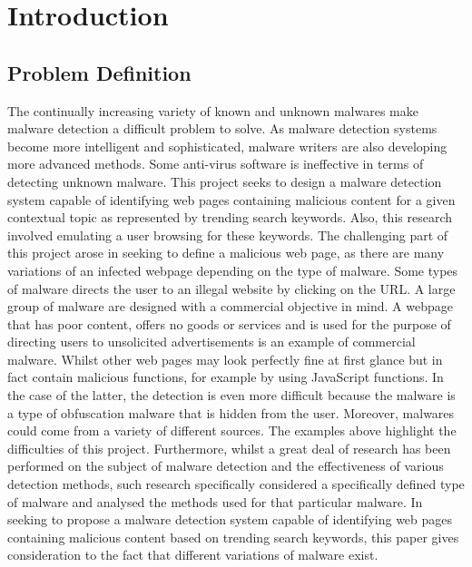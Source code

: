 \section{Introduction}

\subsection{Problem Definition}

The continually increasing variety of known and unknown malwares make malware detection a difficult problem to solve. As malware detection systems become more intelligent and sophisticated, malware writers are also developing more advanced methods. Some anti-virus software is ineffective in terms of detecting unknown malware. This project seeks to design a malware detection system capable of identifying web pages containing malicious content for a given contextual topic as represented by trending search keywords. 
Also, this research involved emulating a user browsing for these keywords. The challenging part of this project arose in seeking to define a malicious web page, as there are many variations of an infected webpage depending on the type of malware. 
Some types of malware directs the user to an illegal website by clicking on the URL. A large group of malware are designed with a commercial objective in mind. A webpage that has poor content, offers no goods or services and is used for the purpose of directing users to unsolicited advertisements is an example of commercial malware. Whilst other web pages may look perfectly fine at first glance but in fact contain malicious functions, for example by using JavaScript functions. In the case of the latter, the detection is even more difficult because the malware is a type of obfuscation malware that is hidden from the user. Moreover, malwares could come from a variety of different sources.
The examples above highlight the difficulties of this project. Furthermore, whilst a great deal of research has been performed on the subject of malware detection and the effectiveness of various detection methods, such research specifically considered a specifically defined type of malware and analysed the methods used for that particular malware. 
In seeking to propose a malware detection system capable of identifying web pages containing malicious content based on trending search keywords, this paper gives consideration to the fact that different variations of malware exist. 
